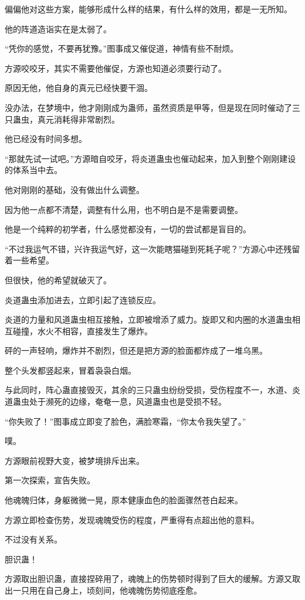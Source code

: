 \begin{this_body}
偏偏他对这些方案，能够形成什么样的结果，有什么样的效用，都是一无所知。

他的阵道造诣实在是太弱了。

“凭你的感觉，不要再犹豫。”图事成又催促道，神情有些不耐烦。

方源咬咬牙，其实不需要他催促，方源也知道必须要行动了。

原因无他，他自身的真元已经快要干涸。

没办法，在梦境中，他才刚刚成为蛊师，虽然资质是甲等，但是现在同时催动了三只蛊虫，真元消耗得非常剧烈。

他已经没有时间多想。

“那就先试一试吧。”方源暗自咬牙，将炎道蛊虫也催动起来，加入到整个刚刚建设的体系当中去。

他对刚刚的基础，没有做出什么调整。

因为他一点都不清楚，调整有什么用，也不明白是不是需要调整。

他是一个纯粹的初学者，什么感觉都没有，一切的尝试都是盲目的。

“不过我运气不错，兴许我运气好，这一次能瞎猫碰到死耗子呢？”方源心中还残留着一些希望。

但很快，他的希望就破灭了。

炎道蛊虫添加进去，立即引起了连锁反应。

炎道的力量和风道蛊虫相互接触，立即被增添了威力。旋即又和内圈的水道蛊虫相互碰撞，水火不相容，直接发生了爆炸。

砰的一声轻响，爆炸并不剧烈，但还是把方源的脸面都炸成了一堆乌黑。

整个头发都竖起来，冒着袅袅白烟。

与此同时，阵心蛊直接毁灭，其余的三只蛊虫纷纷受损，受伤程度不一，水道、炎道蛊虫处于濒死的边缘，奄奄一息，风道蛊虫也是受损不轻。

“你失败了！”图事成立即变了脸色，满脸寒霜，“你太令我失望了。”

噗。

方源眼前视野大变，被梦境排斥出来。

第一次探索，宣告失败。

他魂魄归体，身躯微微一晃，原本健康血色的脸面骤然苍白起来。

方源立即检查伤势，发现魂魄受伤的程度，严重得有点超出他的意料。

不过没有关系。

胆识蛊！

方源取出胆识蛊，直接捏碎用了，魂魄上的伤势顿时得到了巨大的缓解。方源又取出一只用在自己身上，顷刻间，他魂魄伤势彻底痊愈。


\end{this_body}
